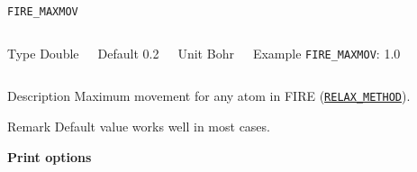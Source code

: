 \documentclass[xcolor=dvipsnames,t]{beamer}
\begin{document}
\begin{frame}[allowframebreaks]{\texttt{FIRE\_MAXMOV}} \label{FIRE_MAXMOV}
\vspace*{-12pt}
\begin{columns}
\begin{block}{Type}
Double
\end{block}

\begin{block}{Default}
0.2
\end{block}

\begin{block}{Unit}
Bohr
\end{block}

\begin{block}{Example}
\texttt{FIRE\_MAXMOV}: 1.0
\end{block}
\end{columns}

\begin{block}{Description}
Maximum movement for any atom in FIRE (\hyperlink{RELAX_METHOD}{\texttt{RELAX\_METHOD}}).
\end{block}

\begin{block}{Remark}
Default value works well in most cases.
\end{block}

\end{frame}


\begin{frame}[allowframebreaks,c]{} \label{Print options}

\begin{center}
\Huge \textbf{Print options}
\end{center}

\end{frame}
\end{document}
